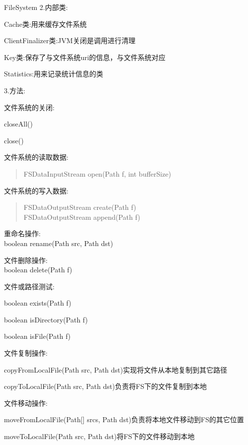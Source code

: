 \begin{XeClass}{FileSystem}
 2.内部类:
 \begin{XeEnum}
 \item Cache类:用来缓存文件系统
 \item ClientFinalizer类:JVM关闭是调用进行清理
 \item Key类:保存了与文件系统uri的信息，与文件系统对应
 \item Statistics:用来记录统计信息的类
 \end{XeEnum}
 
 3.方法:
 
 文件系统的关闭:
 \begin{XeEnum}
 \item closeAll()
 \item close()
 \end{XeEnum}
 
 文件系统的读取数据:
 \begin{quote}
 FSDataInputStream open(Path f, int bufferSize)
 \end{quote}
 
 文件系统的写入数据:
 \begin{quote}
 FSDataOutputStream create(Path f) \\
 FSDataOutputStream append(Path f) 
 \end{quote}
 
 重命名操作: \\
 boolean rename(Path src, Path dst)
 
 文件删除操作: \\
 boolean delete(Path f)
 
 文件或路径测试: \\
 \begin{XeEnum}
 \item boolean exists(Path f)
 \item boolean isDirectory(Path f)
 \item boolean isFile(Path f)
 \end{XeEnum}
 
 文件复制操作:
 \begin{XeEnum}
 \item copyFromLocalFile(Path src, Path dst)实现将文件从本地复制到其它路径
 \item copyToLocalFile(Path src, Path dst)负责将FS下的文件复制到本地
 \end{XeEnum}
 
 文件移动操作: \\
 \begin{XeEnum}
 \item moveFromLocalFile(Path[] srcs, Path dst)负责将本地文件移动到FS的其它位置
 \item moveToLocalFile(Path src, Path dst)将FS下的文件移动到本地
 \end{XeEnum}
  

\end{XeClass}
